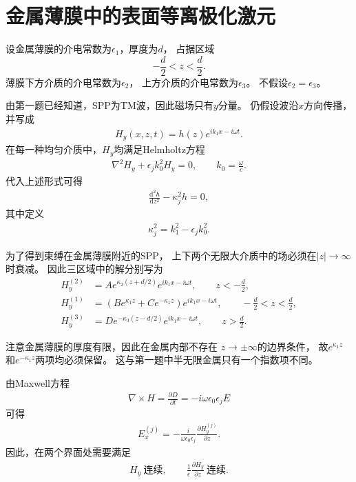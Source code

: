 \documentclass{article}
\newcommand{\xd}{\nabla \times}%
\newcommand{\dvv}[2]{\frac{\mathrm d^2 #1}{\mathrm d #2^2}}
\newcommand{\pdv}[2]{\frac{\partial #1}{\partial #2}}
\begin{document}
\section{金属薄膜中的表面等离极化激元}

设金属薄膜的介电常数为$\epsilon_1$，厚度为$d$，
占据区域
\[
-\frac d2<z<\frac d2.
\]
薄膜下方介质的介电常数为$\epsilon_2$，
上方介质的介电常数为$\epsilon_3$。
不假设$\epsilon_2=\epsilon_3$。

由第一题已经知道，SPP为TM波，因此磁场只有$y$分量。
仍假设波沿$x$方向传播，并写成
\begin{align}
    H_y(x,z,t)=h(z)e^{ik_1x-i\omega t}.
\end{align}
在每一种均匀介质中，$H_y$均满足Helmholtz方程
\begin{align}
    \nabla^2 H_y+\epsilon_j k_0^2H_y=0,
    \qquad
    k_0=\frac{\omega}{c}.
\end{align}
代入上述形式可得
\begin{align}
    \dvv{h}{z}
    -
    \kappa_j^2 h=0,
\end{align}
其中定义
\begin{align}
    \kappa_j^2
    =
    k_1^2-\epsilon_jk_0^2.
\end{align}

为了得到束缚在金属薄膜附近的SPP，
上下两个无限大介质中的场必须在$|z|\rightarrow\infty$时衰减。
因此三区域中的解分别写为
\begin{align}
H_y^{(2)}
&=
A e^{\kappa_2(z+d/2)}
e^{ik_1x-i\omega t},
\qquad z<-\frac d2,
\\
H_y^{(1)}
&=
\left(
B e^{\kappa_1 z}
+
C e^{-\kappa_1 z}
\right)
e^{ik_1x-i\omega t},
\qquad
-\frac d2<z<\frac d2,
\\
H_y^{(3)}
&=
D e^{-\kappa_3(z-d/2)}
e^{ik_1x-i\omega t},
\qquad z>\frac d2.
\end{align}

注意金属薄膜的厚度有限，因此在金属内部不存在
$z\rightarrow\pm\infty$的边界条件，
故$e^{\kappa_1z}$和$e^{-\kappa_1z}$两项均必须保留。
这与第一题中半无限金属只有一个指数项不同。

由Maxwell方程
\begin{align}
    \xd H
    =
    \pdv{D}{t}
    =
    -i\omega\epsilon_0\epsilon_j E
\end{align}
可得
\begin{align}
    E_x^{(j)}
    =
    -\frac{i}{\omega\epsilon_0\epsilon_j}
    \pdv{H_y^{(j)}}{z}.
\end{align}
因此，在两个界面处需要满足
\begin{align}
    H_y\ \text{连续},
    \qquad
    \frac{1}{\epsilon}
    \pdv{H_y}{z}\ \text{连续}.
\end{align}
\end{document}
